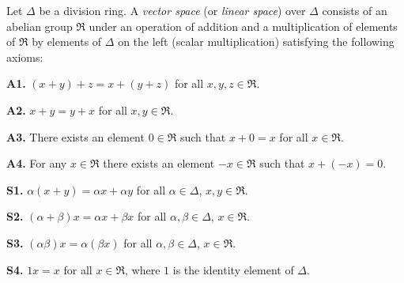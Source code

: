 Let $\Delta$ be a division ring. A \emph{vector space} (or \emph{linear space}) over $\Delta$ consists of an abelian group $\mathfrak{R}$ under an operation of addition and a multiplication of elements of $\mathfrak{R}$ by elements of $\Delta$ on the left (scalar multiplication) satisfying the following axioms:

\textbf{A1.} $(x + y) + z = x + (y + z)$ for all $x, y, z \in \mathfrak{R}$.

\textbf{A2.} $x + y = y + x$ for all $x, y \in \mathfrak{R}$.

\textbf{A3.} There exists an element $0 \in \mathfrak{R}$ such that $x + 0 = x$ for all $x \in \mathfrak{R}$.

\textbf{A4.} For any $x \in \mathfrak{R}$ there exists an element $-x \in \mathfrak{R}$ such that $x + (-x) = 0$.

\textbf{S1.} $\alpha(x + y) = \alpha x + \alpha y$ for all $\alpha \in \Delta$, $x, y \in \mathfrak{R}$.

\textbf{S2.} $(\alpha + \beta)x = \alpha x + \beta x$ for all $\alpha, \beta \in \Delta$, $x \in \mathfrak{R}$.

\textbf{S3.} $(\alpha\beta)x = \alpha(\beta x)$ for all $\alpha, \beta \in \Delta$, $x \in \mathfrak{R}$.

\textbf{S4.} $1x = x$ for all $x \in \mathfrak{R}$, where $1$ is the identity element of $\Delta$.
